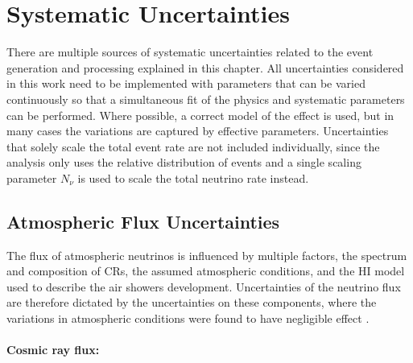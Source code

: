 \section{Systematic Uncertainties} 


There are multiple sources of systematic uncertainties related to the event generation and processing explained in this chapter. 
All uncertainties considered in this work need to be implemented with parameters that can be varied continuously so that a simultaneous fit of the physics and systematic parameters can be performed. Where possible, a correct model of the effect is used, but in many cases the variations are captured by effective parameters. Uncertainties that solely scale the total event rate are not included individually, since the analysis only uses the relative distribution of events and a single scaling parameter $N_{\nu}$ is used to scale the total neutrino rate instead.


\subsection{Atmospheric Flux Uncertainties} 

The flux of atmospheric neutrinos is influenced by multiple factors, the spectrum and composition of CRs, the assumed atmospheric conditions, and the HI model used to describe the air showers development. Uncertainties of the neutrino flux are therefore dictated by the uncertainties on these components, where the variations in atmospheric conditions were found to have negligible effect .


\paragraph{Cosmic ray flux:}


